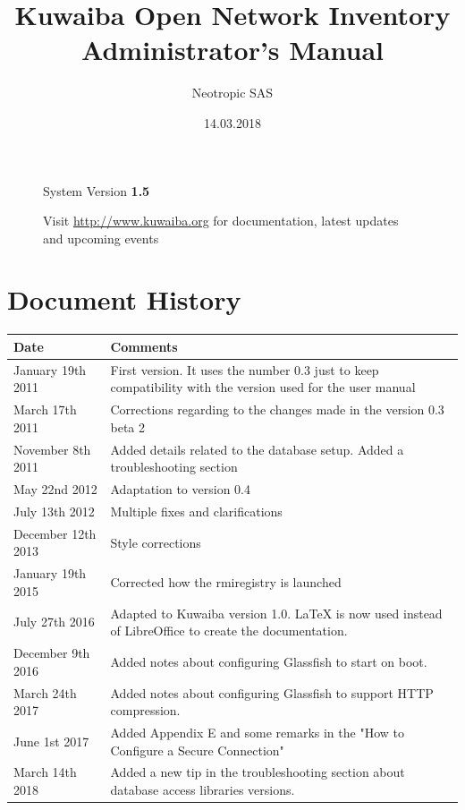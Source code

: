 \documentclass[a4paper]{article}
\title{Kuwaiba Open Network Inventory Administrator's Manual}
\author{Neotropic SAS}
\date{14.03.2018}
\begin{document}
	\maketitle
	
	
	
	\begin{figure}[b]
		\centering System Version \textbf{1.5}
			
		Visit \url{http://www.kuwaiba.org} for documentation, latest updates and upcoming events
	\end{figure}
	
	
	\newpage
	
	\tableofcontents

	\newpage
	\section{Document History}
		\begin{table}[h!]
			\centering
			\begin{tabular}{l||p{10cm}} %
				\toprule
				\textbf{Date} & \textbf{Comments}  \\
				\midrule
				January 19th 2011 & First version. It uses the number 0.3 just to keep compatibility with the version used for the user manual\\
				\midrule
				March 17th 2011 & Corrections regarding to the changes made in the version 0.3 beta 2 \\
				\midrule
				November 8th 2011 & Added details related to the database setup. Added a troubleshooting section \\
				\midrule
				May 22nd 2012 & Adaptation to version 0.4 \\
				\midrule
				July 13th 2012 & Multiple fixes and clarifications \\
				\midrule
				December 12th 2013 & Style corrections \\
				\midrule
				January 19th 2015 & Corrected how the rmiregistry is launched \\
				\midrule
				July 27th 2016 & Adapted to Kuwaiba version 1.0. LaTeX is now used instead of LibreOffice to create the documentation. \\
				\midrule
				December 9th 2016 & Added notes about configuring Glassfish to start on boot. \\
				\midrule
				March 24th 2017 & Added notes about configuring Glassfish to support HTTP compression. \\
				\midrule
				June 1st 2017 & Added Appendix E and some remarks in the "How to Configure a Secure Connection"\\
				\midrule
				March 14th 2018 & Added a new tip in the troubleshooting section about database access libraries versions.\\
				\bottomrule
			\end{tabular}	
				
		\end{table}
	\newpage
\end{document}
